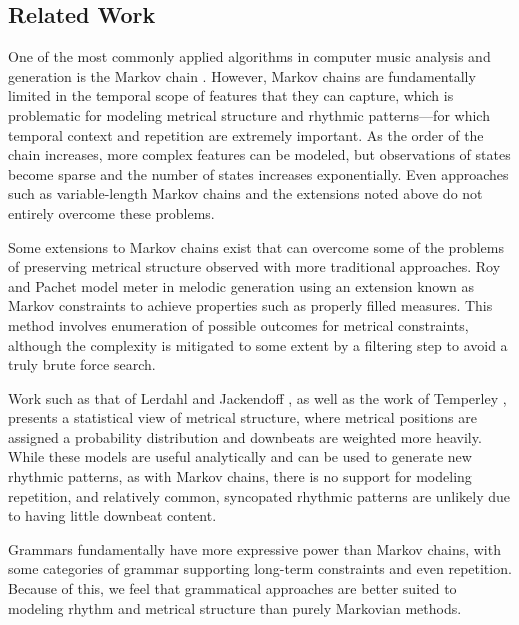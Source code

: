 \documentclass{article}
\begin{document}
\subsection{Related Work}

One of the most commonly applied algorithms in computer music analysis and generation is the Markov chain \cite{chordia2011, gillick2009, yi, pachet}. However, Markov chains are fundamentally limited in the temporal scope of features that they can capture, which is problematic for modeling metrical structure and rhythmic patterns---for which temporal context and repetition are extremely important. As the order of the chain increases, more complex features can be modeled, but observations of states become sparse and the number of states increases exponentially. Even approaches such as variable-length Markov chains \cite{ron, buhlmann} and the extensions noted above do not entirely overcome these problems.

Some extensions to Markov chains exist that can overcome some of the problems of preserving metrical structure observed with more traditional approaches. Roy and Pachet model meter in melodic generation \cite{roy2013} using an extension known as Markov constraints \cite{pachet2011} to achieve properties such as properly filled measures. This method involves enumeration of possible outcomes for metrical constraints, although the complexity is mitigated to some extent by a filtering step to avoid a truly brute force search.

Work such as that of Lerdahl and Jackendoff \cite{gttm}, as well as the work of Temperley \cite{temperley2010}, presents a statistical view of metrical structure, where metrical positions are assigned a probability distribution and downbeats are weighted more heavily. While these models are useful analytically and can be used to generate new rhythmic patterns, as with Markov chains, there is no support for modeling repetition, and relatively common, syncopated rhythmic patterns are unlikely due to having little downbeat content. 

Grammars fundamentally have more expressive power \linebreak than Markov chains, with some categories of grammar supporting long-term constraints and even repetition. Because of this, we feel that grammatical approaches are better \linebreak suited to modeling rhythm and metrical structure than \linebreak purely Markovian methods.
\end{document}
